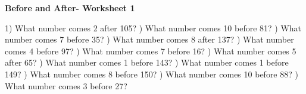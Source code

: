 \documentclass{article}%
\begin{document}
\newline%
\newline%
\newline%
\pagebreak%
\large%
\begin{center}%
\textbf{Before and After- Worksheet 1}%
\newline%
\newline%
\newline%
\end{center} \normalsize%
1) What number comes 2 after 105?%
\newline%
\newline%
) What number comes 10 before 81?%
\newline%
\newline%
) What number comes 7 before 35?%
\newline%
\newline%
) What number comes 8 after 137?%
\newline%
\newline%
) What number comes 4 before 97?%
\newline%
\newline%
) What number comes 7 before 16?%
\newline%
\newline%
) What number comes 5 after 65?%
\newline%
\newline%
) What number comes 1 before 143?%
\newline%
\newline%
) What number comes 1 before 149?%
\newline%
\newline%
) What number comes 8 before 150?%
\newline%
\newline%
) What number comes 10 before 88?%
\newline%
\newline%
) What number comes 3 before 27?%
\newline%
\end{document}
